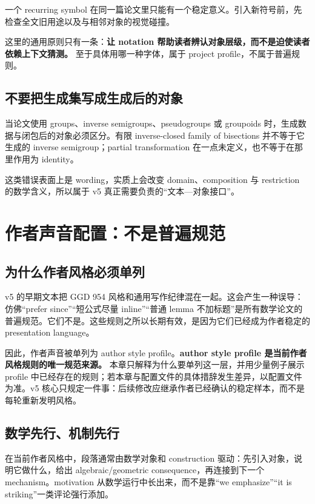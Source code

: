 \documentclass[UTF8,fontset=none,12pt,openany]{ctexbook}
\begin{document}
一个 recurring symbol 在同一篇论文里只能有一个稳定意义。引入新符号前，先检查全文旧用途以及与相邻对象的视觉碰撞。

这里的通用原则只有一条：\textbf{让 notation 帮助读者辨认对象层级，而不是迫使读者依赖上下文猜测。} 至于具体用哪一种字体，属于 project profile，不属于普遍规则。

\section{不要把生成集写成生成后的对象}

当论文使用 groups、inverse semigroups、pseudogroups 或 groupoids 时，生成数据与闭包后的对象必须区分。有限 inverse-closed family of bisections 并不等于它生成的 inverse semigroup；partial transformation 在一点未定义，也不等于在那里作用为 identity。

这类错误表面上是 wording，实质上会改变 domain、composition 与 restriction 的数学含义，所以属于 v5 真正需要负责的“文本—对象接口”。

\chapter{作者声音配置：不是普遍规范}

\section{为什么作者风格必须单列}

v5 的早期文本把 GGD 954 风格和通用写作纪律混在一起。这会产生一种误导：仿佛“prefer since”“短公式尽量 inline”“普通 lemma 不加标题”是所有数学论文的普遍规范。它们不是。这些规则之所以长期有效，是因为它们已经成为作者稳定的 presentation language。

因此，作者声音被单列为 author style profile。\textbf{author style profile 是当前作者风格规则的唯一规范来源。} 本章只解释为什么要单列这一层，并用少量例子展示 profile 中已经存在的规则；若本章与配置文件的具体措辞发生差异，以配置文件为准。v5 核心只规定一件事：后续修改应继承作者已经确认的稳定样本，而不是每轮重新发明风格。

\section{数学先行、机制先行}

在当前作者风格中，段落通常由数学对象和 construction 驱动：先引入对象，说明它做什么，给出 algebraic/geometric consequence，再连接到下一个 mechanism。motivation 从数学运行中长出来，而不是靠“we emphasize”“it is striking”一类评论强行添加。
\end{document}
